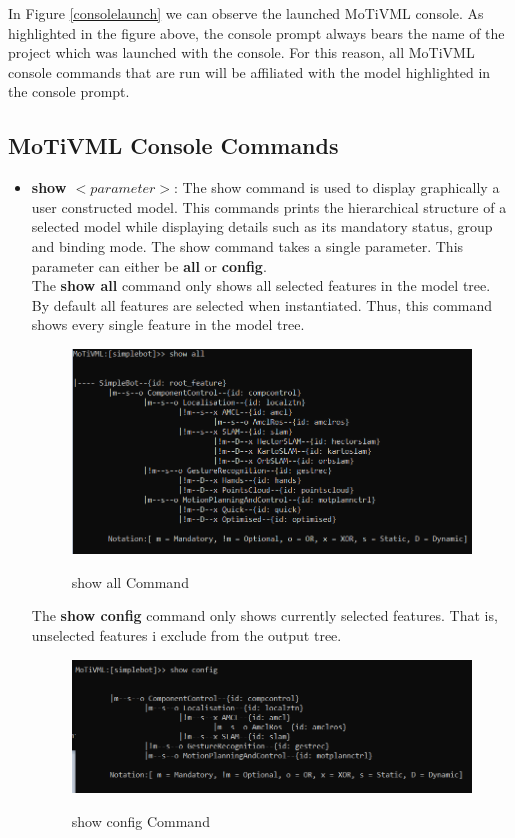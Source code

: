 \documentclass{article}
\begin{document}
In Figure \ref{consolelaunch} we can observe the launched MoTiVML console. As highlighted in the figure above, the console prompt always bears the name of the project which was launched with the  console. For this reason, all MoTiVML console commands that are run will be affiliated with the model highlighted in the console prompt.

\subsection{MoTiVML Console Commands}

\begin{itemize}
	\item \textbf{show $<parameter>$}: The show command is used to display graphically a user constructed model. This commands prints the hierarchical structure of a selected model while displaying details such as its mandatory status, group and binding mode. The show command takes a single parameter. This parameter can either be \textbf{all} or  \textbf{config}. \\
	
	The \textbf{show all} command only shows all selected features in the model tree. By default all features are selected when instantiated. Thus, this command shows every single feature in the model tree.
	
	\begin{figure}[H]
		\caption{show all Command}
		\centering
		\includegraphics[width=\columnwidth]{images/showall.png}
		\label{showall}
	\end{figure}

	The \textbf{show config} command only shows currently selected features. That is, unselected features i exclude from the output tree.

	\begin{figure}[H]
		\caption{show config Command}
		\centering
		\includegraphics[width=\columnwidth]{images/showconfig.png}
		\label{showconfig}
	\end{figure}


\end{itemize}
\end{document}
